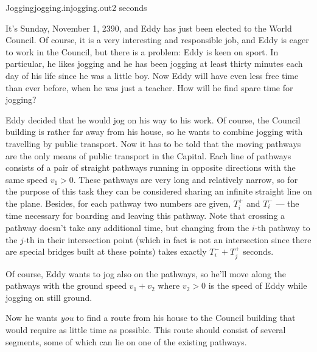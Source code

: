 \begin{problem}{Jogging}{jogging.in}{jogging.out}{2 seconds}

It's Sunday, November 1, 2390, and Eddy has just been elected 
to the World Council. Of course, it is a very interesting and responsible 
job, and Eddy is eager to work in the Council, but there is a problem:  
Eddy is keen on sport. In particular, he likes jogging and he has been jogging 
at least thirty minutes each day of his life since he was a little boy. 
Now Eddy will have even less free time than ever before, when he was just a 
teacher. How will he find spare time for jogging?

Eddy %
decided that 
he would jog on his way to his work. Of course, the Council building is 
rather far away from his house, so he wants to combine jogging with 
travelling by public transport. Now it has to be told that 
the moving pathways are the only means of public transport in the Capital.
Each line of pathways consists of a pair of straight pathways running 
in opposite directions with the same speed $v_1>0$. These pathways are very 
long and relatively narrow, so for the purpose of this task they can 
be considered sharing an infinite straight line on the plane. Besides, for 
each pathway two numbers are given, $T^+_i$ and $T^-_i$ --- the time 
necessary for boarding and leaving this pathway.
Note that crossing a pathway doesn't take any additional time, but changing 
from the $i$-th pathway to the $j$-th in their intersection point (which in fact 
is not an intersection since there are special bridges built at these points) 
takes exactly $T^-_i+T^+_j$ seconds.

Of course, Eddy wants to jog also on the pathways, so he'll move along the 
pathways with the ground speed $v_1+v_2$ where $v_2>0$ is the speed of 
Eddy while jogging on still ground. 

Now he wants {\em you} %
to find a route from his house to the Council building that would require 
as little time as possible. %
This route should consist of several segments, some of which can lie on 
one of the existing pathways. 

\InputFile


\end{problem}

